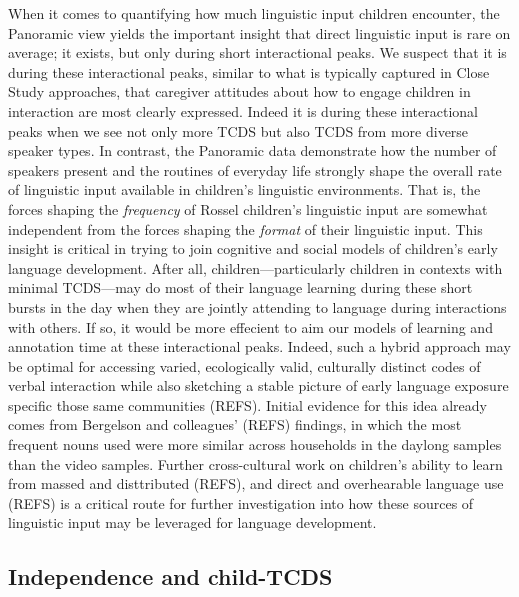 \documentclass[,man,floatsintext]{apa6}
\begin{document}
When it comes to quantifying how much linguistic input children
encounter, the Panoramic view yields the important insight that direct
linguistic input is rare on average; it exists, but only during short
interactional peaks. We suspect that it is during these interactional
peaks, similar to what is typically captured in Close Study approaches,
that caregiver attitudes about how to engage children in interaction are
most clearly expressed. Indeed it is during these interactional peaks
when we see not only more TCDS but also TCDS from more diverse speaker
types. In contrast, the Panoramic data demonstrate how the number of
speakers present and the routines of everyday life strongly shape the
overall rate of linguistic input available in children's linguistic
environments. That is, the forces shaping the \emph{frequency} of Rossel
children's linguistic input are somewhat independent from the forces
shaping the \emph{format} of their linguistic input. This insight is
critical in trying to join cognitive and social models of children's
early language development. After all, children---particularly children
in contexts with minimal TCDS---may do most of their language learning
during these short bursts in the day when they are jointly attending to
language during interactions with others. If so, it would be more
effecient to aim our models of learning and annotation time at these
interactional peaks. Indeed, such a hybrid approach may be optimal for
accessing varied, ecologically valid, culturally distinct codes of
verbal interaction while also sketching a stable picture of early
language exposure specific those same communities (REFS). Initial
evidence for this idea already comes from Bergelson and colleagues'
(REFS) findings, in which the most frequent nouns used were more similar
across households in the daylong samples than the video samples. Further
cross-cultural work on children's ability to learn from massed and
disttributed (REFS), and direct and overhearable language use (REFS) is
a critical route for further investigation into how these sources of
linguistic input may be leveraged for language development.

\subsection{Independence and
child-TCDS}\label{independence-and-child-tcds}
\end{document}
